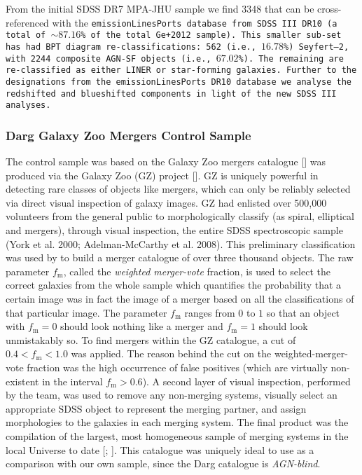 From the initial SDSS DR7 MPA-JHU sample we find 3348 that can be cross-referenced with the \tt{emissionLinesPorts} database from SDSS III DR10 (a total of $\sim{87.16}$\% of the total Ge+2012 sample). This smaller sub-set has had BPT diagram re-classifications: 562 (i.e., $16.78$\%) Seyfert--2, with 2244 composite AGN-SF objects (i.e., $67.02$\%). The remaining are re-classified as either LINER or star-forming galaxies. Further to the designations from the \tt{emissionLinesPorts} DR10 database we analyse the redshifted and blueshifted components in light of the new SDSS III analyses.

\subsubsection{Darg Galaxy Zoo Mergers Control Sample}

The control sample was based on the Galaxy Zoo mergers catalogue [\cite{2010MNRAS.401.1552D}] was produced via the Galaxy Zoo (GZ) project [\cite{2008MNRAS.389.1179L}]. GZ is uniquely powerful in detecting rare classes of objects like mergers, which can only be reliably selected via direct visual inspection of galaxy images. GZ had enlisted over 500,000 volunteers from the general public to morphologically classify (as spiral, elliptical and mergers), through visual inspection, the entire SDSS spectroscopic sample (York et al. 2000; Adelman-McCarthy et al. 2008). This preliminary classification was used by \cite{2010MNRAS.401.1043D} to build a merger catalogue of over three thousand objects. The raw parameter $f_{\text{m}}$, called the \textit{weighted merger-vote} fraction, is used to select the correct galaxies from the whole sample which quantifies the probability that a certain image was in fact the image of a merger based on all the classifications of that particular image. The parameter $f_{\text{m}}$ ranges from $0$ to $1$ so that an object with $f_{\text{m}}=0$ should look nothing like a merger and $f_{\text{m}}=1$ should look unmistakably so. To find mergers within the GZ catalogue, a cut of ${0.4}<{f_{\text{m}}}<{1.0}$ was applied. The reason behind the cut on the weighted-merger- vote fraction was the high occurrence of false positives (which are virtually non-existent in the interval $f_{\text{m}}>{0.6}$). A second layer of visual inspection, performed by the team, was used to remove any non-merging systems, visually select an appropriate SDSS object to represent the merging partner, and assign morphologies to the galaxies in each merging system. The final product was the compilation of the largest, most homogeneous sample of merging systems in the local Universe to date [\cite{2010MNRAS.401.1552D}; \cite{2010MNRAS.401.1043D}]. This catalogue was uniquely ideal to use as a comparison with our own sample, since the Darg catalogue is \textit{AGN-blind}.
